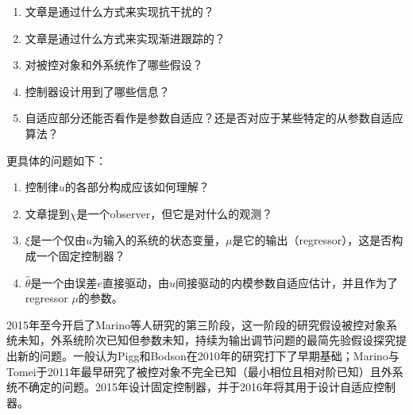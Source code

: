 \documentclass[
  12pt,
  a4paper
]{article}
\begin{document}
\begin{enumerate}
\def\labelenumi{\arabic{enumi}.}
\item
  文章是通过什么方式来实现抗干扰的？
\item
  文章是通过什么方式来实现渐进跟踪的？
\item
  对被控对象和外系统作了哪些假设？
\item
  控制器设计用到了哪些信息？
\item
  自适应部分还能否看作是参数自适应？还是否对应于某些特定的从参数自适应算法？
\end{enumerate}

更具体的问题如下：

\begin{enumerate}
\def\labelenumi{\arabic{enumi}.}
\item
  控制律\(u\)的各部分构成应该如何理解？
\item
  文章提到\(\chi\)是一个observer，但它是对什么的观测？
\item
  \(\xi\)是一个仅由\(u\)为输入的系统的状态变量，\(\mu\)是它的输出（regressor），这是否构成一个固定控制器？
\item
  \(\widehat{\theta}\)是一个由误差\(e\)直接驱动，由\(u\)间接驱动的内模参数自适应估计，并且作为了regressor
  \(\mu\)的参数。
\end{enumerate}

2015年至今开启了Marino等人研究的第三阶段，这一阶段的研究假设被控对象系统未知，外系统阶次已知但参数未知，持续为输出调节问题的最简先验假设探究提出新的问题。一般认为Pigg和Bodson在2010年的研究打下了早期基础；Marino与Tomei于2011年最早研究了被控对象不完全已知（最小相位且相对阶已知）且外系统不确定的问题。2015年设计固定控制器，并于2016年将其用于设计自适应控制器。
\end{document}
